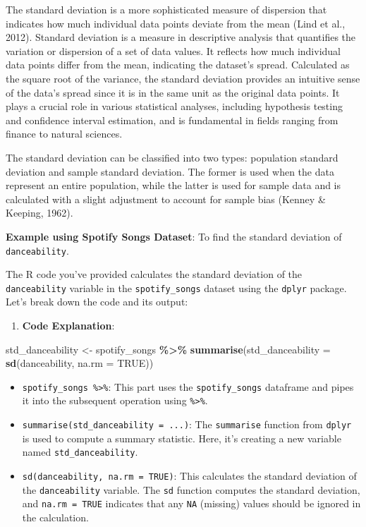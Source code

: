\documentclass[
]{book}
\newenvironment{Shaded}{\begin{snugshade}}{\end{snugshade}}
\newcommand{\AttributeTok}[1]{\textcolor[rgb]{0.13,0.29,0.53}{#1}}
\newcommand{\ConstantTok}[1]{\textcolor[rgb]{0.56,0.35,0.01}{#1}}
\newcommand{\FunctionTok}[1]{\textcolor[rgb]{0.13,0.29,0.53}{\textbf{#1}}}
\newcommand{\NormalTok}[1]{#1}
\newcommand{\OtherTok}[1]{\textcolor[rgb]{0.56,0.35,0.01}{#1}}
\newcommand{\SpecialCharTok}[1]{\textcolor[rgb]{0.81,0.36,0.00}{\textbf{#1}}}
\providecommand{\tightlist}{%
  \setlength{\itemsep}{0pt}\setlength{\parskip}{0pt}}
\begin{document}
The standard deviation is a more sophisticated measure of dispersion that indicates how much individual data points deviate from the mean (Lind et al., 2012). Standard deviation is a measure in descriptive analysis that quantifies the variation or dispersion of a set of data values. It reflects how much individual data points differ from the mean, indicating the dataset's spread. Calculated as the square root of the variance, the standard deviation provides an intuitive sense of the data's spread since it is in the same unit as the original data points. It plays a crucial role in various statistical analyses, including hypothesis testing and confidence interval estimation, and is fundamental in fields ranging from finance to natural sciences.

The standard deviation can be classified into two types: population standard deviation and sample standard deviation. The former is used when the data represent an entire population, while the latter is used for sample data and is calculated with a slight adjustment to account for sample bias (Kenney \& Keeping, 1962).

\textbf{Example using Spotify Songs Dataset}: To find the standard deviation of \texttt{danceability}.

The R code you've provided calculates the standard deviation of the \texttt{danceability} variable in the \texttt{spotify\_songs} dataset using the \texttt{dplyr} package. Let's break down the code and its output:

\begin{enumerate}
\def\labelenumi{\arabic{enumi}.}
\tightlist
\item
  \textbf{Code Explanation}:
\end{enumerate}

\begin{Shaded}
\begin{Highlighting}[]
\NormalTok{std\_danceability }\OtherTok{\textless{}{-}}\NormalTok{ spotify\_songs }\SpecialCharTok{\%\textgreater{}\%}
  \FunctionTok{summarise}\NormalTok{(}\AttributeTok{std\_danceability =} \FunctionTok{sd}\NormalTok{(danceability, }\AttributeTok{na.rm =} \ConstantTok{TRUE}\NormalTok{))}
\end{Highlighting}
\end{Shaded}

\begin{itemize}
\tightlist
\item
  \texttt{spotify\_songs\ \%\textgreater{}\%}: This part uses the \texttt{spotify\_songs} dataframe and pipes it into the subsequent operation using \texttt{\%\textgreater{}\%}.
\item
  \texttt{summarise(std\_danceability\ =\ ...)}: The \texttt{summarise} function from \texttt{dplyr} is used to compute a summary statistic. Here, it's creating a new variable named \texttt{std\_danceability}.
\item
  \texttt{sd(danceability,\ na.rm\ =\ TRUE)}: This calculates the standard deviation of the \texttt{danceability} variable. The \texttt{sd} function computes the standard deviation, and \texttt{na.rm\ =\ TRUE} indicates that any \texttt{NA} (missing) values should be ignored in the calculation.
\end{itemize}
\end{document}
